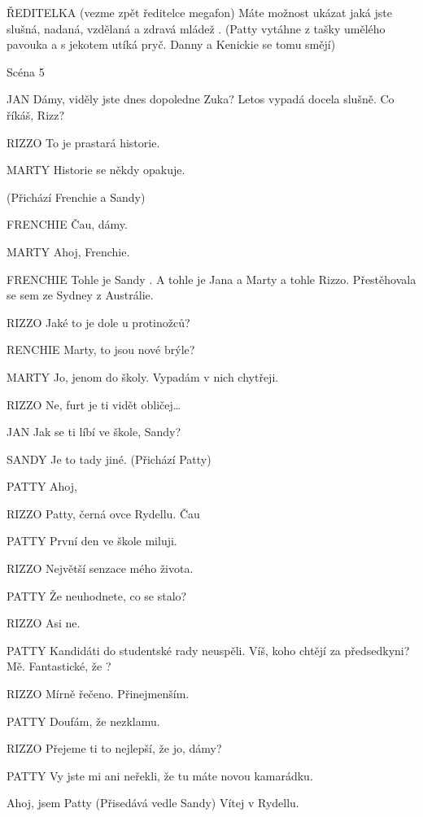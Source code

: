       ŘEDITELKA        (vezme zpět ředitelce megafon) Máte možnost ukázat jaká jste slušná, nadaná, vzdělaná a zdravá mládež . (Patty vytáhne z tašky umělého pavouka a s jekotem utíká pryč.         Danny a Kenickie se tomu smějí)        

                                

Scéna 5 

JAN        Dámy, viděly jste dnes dopoledne Zuka? Letos vypadá docela slušně.         Co říkáš, Rizz?

RIZZO        To je prastará historie.

MARTY        Historie se někdy opakuje.

        (Přichází Frenchie a Sandy)

FRENCHIE        Čau, dámy.

MARTY        Ahoj, Frenchie.

FRENCHIE        Tohle je Sandy . A tohle je Jana a Marty a tohle Rizzo. Přestěhovala se         sem ze Sydney z Austrálie.

RIZZO        Jaké to je dole u protinožců?

RENCHIE        Marty, to jsou nové brýle?

MARTY        Jo, jenom do školy. Vypadám v nich chytřeji.

RIZZO        Ne, furt je ti vidět obličej…

JAN        Jak se ti líbí ve škole, Sandy?

SANDY        Je to tady jiné. (Přichází Patty)

PATTY        Ahoj, 

RIZZO        Patty, černá ovce Rydellu. Čau

PATTY        První den ve škole miluji.

RIZZO        Největší senzace mého života.

PATTY        Že neuhodnete, co se stalo?

RIZZO        Asi ne.

PATTY        Kandidáti do studentské rady neuspěli. Víš, koho chtějí za                         předsedkyni? Mě. Fantastické, že ?

RIZZO        Mírně řečeno. Přinejmenším.

PATTY        Doufám, že nezklamu.

RIZZO        Přejeme ti to nejlepší, že jo, dámy?

PATTY        Vy jste mi ani neřekli, že tu máte novou kamarádku.

                Ahoj, jsem Patty (Přisedává vedle Sandy) Vítej v Rydellu.

